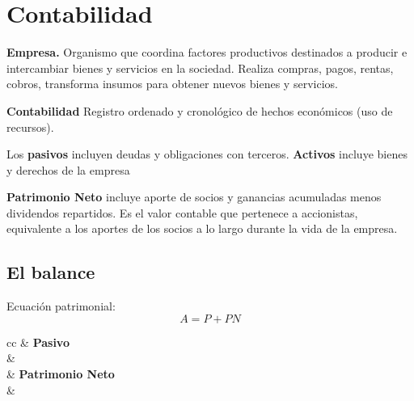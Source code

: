 \documentclass[twocolumn,10pt]{article}
\begin{document}
\section{Contabilidad}

\textbf{Empresa.} Organismo que coordina factores productivos destinados a producir e intercambiar bienes y servicios en la sociedad. Realiza compras, pagos, rentas, cobros, transforma insumos para obtener nuevos bienes y servicios. 

\textbf{Contabilidad} Registro ordenado y cronológico de hechos económicos (uso de recursos).

Los \textbf{pasivos} incluyen deudas y obligaciones con terceros. \textbf{Activos} incluye bienes y derechos de la empresa

 \textbf{Patrimonio Neto} incluye aporte de socios y ganancias acumuladas menos dividendos repartidos. Es el valor contable que pertenece a accionistas, equivalente a los aportes de los socios a lo largo durante la vida de la empresa.

\subsection{El balance}

Ecuación patrimonial: 
\[
A = P + PN
\]

\begin{table}[h!]
	\centering
	\begin{tabular}{cc}
		 & \textbf{Pasivo} \\ 
		 &  \\
		& \textbf{Patrimonio Neto} \\
		 & 
	\end{tabular}
\end{table}
\end{document}
